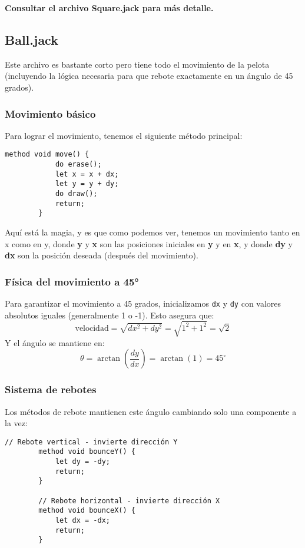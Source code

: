 \documentclass[twocolumn]{article}
\begin{document}
	\textbf{Consultar el archivo Square.jack para más detalle.}
	
	\subsection{Ball.jack}
	Este archivo es bastante corto pero tiene todo el movimiento de la pelota (incluyendo la lógica necesaria para que rebote exactamente en un ángulo de 45 grados). 
	
	\subsubsection{Movimiento básico}
	Para lograr el movimiento, tenemos el siguiente método principal:
	
	\begin{lstlisting}[caption=Método move() de la pelota]
		method void move() {
			do erase();
			let x = x + dx;
			let y = y + dy;
			do draw();
			return;
		}
	\end{lstlisting}
	
	Aquí está la magia, y es que como podemos ver, tenemos un movimiento tanto en x como en y, donde \textbf{y} y \textbf{x} son las posiciones iniciales en \textbf{y} y en \textbf{x}, y donde \textbf{dy} y \textbf{dx} son la posición deseada (después del movimiento). 
	
	\subsubsection{Física del movimiento a 45°}
	Para garantizar el movimiento a 45 grados, inicializamos \texttt{dx} y \texttt{dy} con valores absolutos iguales (generalmente 1 o -1). Esto asegura que:
	\[
	\text{velocidad} = \sqrt{dx^2 + dy^2} = \sqrt{1^2 + 1^2} = \sqrt{2}
	\]
	Y el ángulo se mantiene en:
	\[
	\theta = \arctan\left(\frac{dy}{dx}\right) = \arctan(1) = 45^\circ
	\]
	
	\subsubsection{Sistema de rebotes}
	Los métodos de rebote mantienen este ángulo cambiando solo una componente a la vez:
	
	\begin{lstlisting}[caption=Métodos de rebote]
		// Rebote vertical - invierte dirección Y
		method void bounceY() {
			let dy = -dy;
			return;
		}
		
		// Rebote horizontal - invierte dirección X  
		method void bounceX() {
			let dx = -dx;
			return;
		}
	\end{lstlisting}
	
\end{document}
